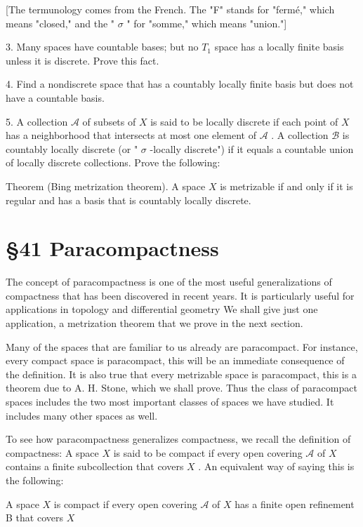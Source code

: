 \documentclass[10pt]{article}
\begin{document}
[The termunology comes from the French. The "F" stands for "fermé," which means "closed," and the " \(\sigma\) " for "somme," which means "union."]

3. Many spaces have countable bases; but no \({T}_{1}\) space has a locally finite basis unless it is discrete. Prove this fact.

4. Find a nondiscrete space that has a countably locally finite basis but does not have a countable basis.

5. A collection \(\mathcal{A}\) of subsets of \(X\) is said to be locally discrete if each point of \(X\) has a neighborhood that intersects at most one element of \(\mathcal{A}\) . A collection \(\mathcal{B}\) is countably locally discrete (or " \(\sigma\) -locally discrete") if it equals a countable union of locally discrete collections. Prove the following:

Theorem (Bing metrization theorem). A space \(X\) is metrizable if and only if it is regular and has a basis that is countably locally discrete.

\section*{§41 Paracompactness}

The concept of paracompactness is one of the most useful generalizations of compactness that has been discovered in recent years. It is particularly useful for applications in topology and differential geometry We shall give just one application, a metrization theorem that we prove in the next section.

Many of the spaces that are familiar to us already are paracompact. For instance, every compact space is paracompact, this will be an immediate consequence of the definition. It is also true that every metrizable space is paracompact, this is a theorem due to A. H. Stone, which we shall prove. Thus the class of paracompact spaces includes the two most important classes of spaces we have studied. It includes many other spaces as well.

To see how paracompactness generalizes compactness, we recall the definition of compactness: A space \(X\) is said to be compact if every open covering \(\mathcal{A}\) of \(X\) contains a finite subcollection that covers \(X\) . An equivalent way of saying this is the following:

A space \(X\) is compact if every open covering \(\mathcal{A}\) of \(X\) has a finite open refinement B that covers \(X\)
\end{document}
